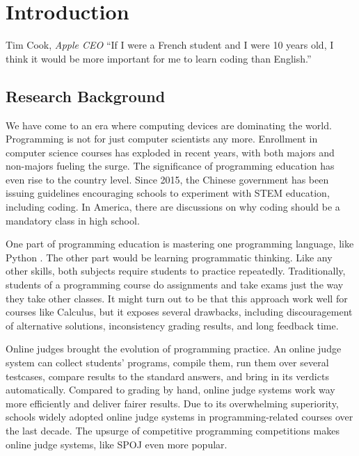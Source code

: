 
\chapter{Introduction}
\label{chap:intro}

\begin{chapquote}{Tim Cook, \textit{Apple CEO}}
    ``If I were a French student and I were 10 years old,
    I think it would be more important for me to learn coding than English.''
\end{chapquote}

\section{Research Background}

    We have come to an era where computing devices are dominating the world.
    Programming is not for just computer scientists any more.
    Enrollment in computer science courses has exploded in recent years,
    with both majors and non-majors fueling the surge.
    The significance of programming education has even rise to the country level.
    Since 2015, the Chinese government has been issuing guidelines encouraging schools
    to experiment with STEM education, including coding. \cite{gov_2015,gov_2017}
    In America, there are discussions on why coding should be a mandatory class in high school.
    \cite{tim_bajrin_why_2014}

    One part of programming education is mastering one programming language, like Python \cite{python.org}.
    The other part would be learning programmatic thinking.
    Like any other skills, both subjects require students to practice repeatedly.
    Traditionally, students of a programming course do assignments and take exams
    just the way they take other classes.
    It might turn out to be that this approach work well for courses like Calculus,
    but it exposes several drawbacks, including discouragement of alternative solutions,
    inconsistency grading results, and long feedback time.

    Online judges brought the evolution of programming practice.
    An online judge system can collect students' programs, compile them,
    run them over several testcases, compare results to the standard answers,
    and bring in its verdicts automatically.
    Compared to grading by hand, online judge systems work way more efficiently and deliver fairer results.
    Due to its overwhelming superiority,
    schools widely adopted online judge systems in programming-related courses over the last decade.
    \cite{Li2005,luo2008programming}
    The upsurge of competitive programming competitions makes online judge systems,
    like SPOJ \cite{kosowski2007application} even more popular.

